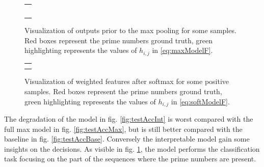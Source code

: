 \begin{figure}
  \centering
  \footnotesize
  \begin{tabular}{|p{\floatwidth}|}
    \hline
    \\
    \hline
    \\
    \hline
    \\
    \hline
    \\
    \hline
    \\
    \hline
    \\
    \hline
  \end{tabular}
  \caption{Visualization of outputs prior to the max pooling for some
    samples. Red boxes represent the prime numbers ground
    truth, green highlighting represents the values of $h_{i,j}$ in
    \eqref{eq:maxModelF}.}
  \label{fig:testAttention}
\end{figure}

\begin{figure}
  \centering
  \footnotesize
  \begin{tabular}{|p{\floatwidth}|}
    \hline
    \\
    \hline
    \\
    \hline
    \\
    \hline
  \end{tabular}
  \caption{Visualization of weighted features after softmax for some
    positive samples. Red boxes represent the prime numbers ground
    truth, green highlighting represents the values of $h_{i,j}$ in
    \eqref{eq:softModelF}.}
  \label{fig:testAttentionSoft}
\end{figure}

The degradation of the model in fig. \ref{fig:testAccInt} is worst
compared with the full \ac{max} model in fig. \ref{fig:testAccMax},
but is still better compared with the baseline in
fig. \ref{fig:testAccBase}. Conversely the interpretable model gain
some insights on the decisions. As visible in
fig. \ref{fig:testAttention}, the model performs the classification
task focusing on 
the part of the sequences where the prime numbers are present.

